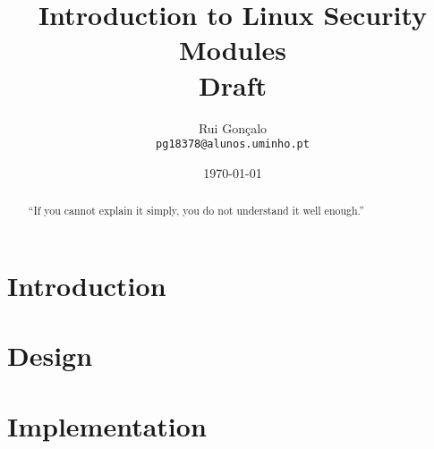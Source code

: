\documentclass[]{article}
\begin{document}
\title{Introduction to Linux Security Modules\\ \small{Draft}}
\author{Rui Gonçalo
        \\{\scriptsize \texttt{pg18378@alunos.uminho.pt}}
       }
\date{\today}
\maketitle

\begin{abstract}
``If you cannot explain it simply, you do not understand it well enough.''
\end{abstract}


\section{Introduction}


\section{Design}


\section{Implementation}




\renewcommand{\bibname}{References}


\end{document}
